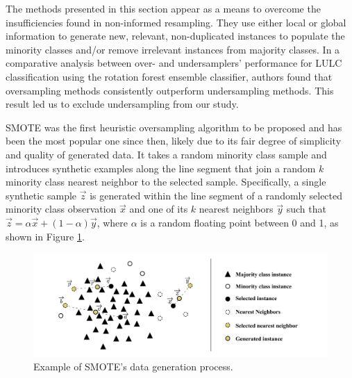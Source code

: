 \documentclass[remotesensing,article,submit,moreauthors,pdftex]{Definitions/mdpi}
\begin{document}
\begin{paracol}{2}
The methods presented in this section appear as a means to overcome the
insufficiencies found in non-informed resampling. They use either local or
global information to generate new, relevant, non-duplicated instances to
populate the minority classes and/or remove irrelevant instances from majority
classes. In a comparative analysis between over- and undersamplers' performance
for LULC classification \cite{Feng2018} using the rotation forest ensemble
classifier, authors found that oversampling methods consistently outperform
undersampling methods. This result led us to exclude undersampling from our
study.

SMOTE \cite{Chawla2002} was the first heuristic oversampling algorithm to be
proposed and has been the most popular one since then, likely due to its fair
degree of simplicity and quality of generated data. It takes a random minority
class sample and introduces synthetic examples along the line segment that join
a random $k$ minority class nearest neighbor to the selected sample.
Specifically, a single synthetic sample $\overrightarrow{z}$ is generated within
the line segment of a randomly selected minority class observation
$\overrightarrow{x}$ and one of its $k$ nearest neighbors $\overrightarrow{y}$
such that $\overrightarrow{z} =
\alpha\overrightarrow{x}+(1-\alpha)\overrightarrow{y}$, where $\alpha$ is a
random floating point between 0 and 1, as shown in Figure
\ref{fig:smote_example}.

\end{paracol}
\begin{figure}[H]
	\centering
	\includegraphics[width=1\linewidth]{../analysis/smote_example}
	\caption{Example of SMOTE's data generation process.}
	\label{fig:smote_example}
\end{figure}
\end{document}
